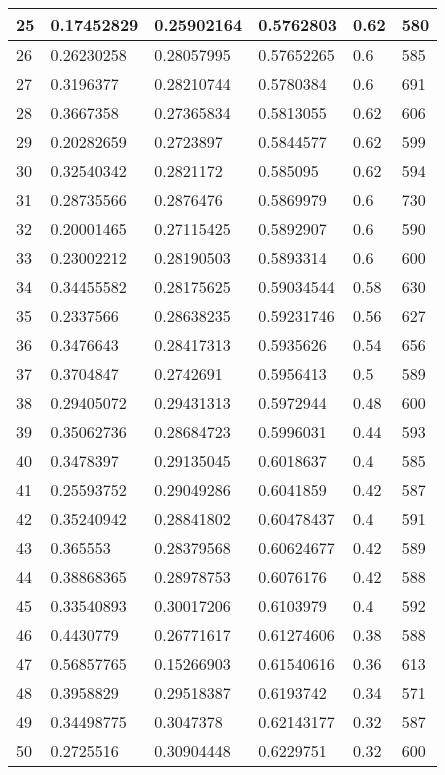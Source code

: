 \begin{longtable}{|l|l|l|l|l|l|}
25 & 0.17452829 & 0.25902164 & 0.5762803 & 0.62 & 580 \\ \hline 
26 & 0.26230258 & 0.28057995 & 0.57652265 & 0.6 & 585 \\ \hline 
27 & 0.3196377 & 0.28210744 & 0.5780384 & 0.6 & 691 \\ \hline 
28 & 0.3667358 & 0.27365834 & 0.5813055 & 0.62 & 606 \\ \hline 
29 & 0.20282659 & 0.2723897 & 0.5844577 & 0.62 & 599 \\ \hline 
30 & 0.32540342 & 0.2821172 & 0.585095 & 0.62 & 594 \\ \hline 
31 & 0.28735566 & 0.2876476 & 0.5869979 & 0.6 & 730 \\ \hline 
32 & 0.20001465 & 0.27115425 & 0.5892907 & 0.6 & 590 \\ \hline 
33 & 0.23002212 & 0.28190503 & 0.5893314 & 0.6 & 600 \\ \hline 
34 & 0.34455582 & 0.28175625 & 0.59034544 & 0.58 & 630 \\ \hline 
35 & 0.2337566 & 0.28638235 & 0.59231746 & 0.56 & 627 \\ \hline 
36 & 0.3476643 & 0.28417313 & 0.5935626 & 0.54 & 656 \\ \hline 
37 & 0.3704847 & 0.2742691 & 0.5956413 & 0.5 & 589 \\ \hline 
38 & 0.29405072 & 0.29431313 & 0.5972944 & 0.48 & 600 \\ \hline 
39 & 0.35062736 & 0.28684723 & 0.5996031 & 0.44 & 593 \\ \hline 
40 & 0.3478397 & 0.29135045 & 0.6018637 & 0.4 & 585 \\ \hline 
41 & 0.25593752 & 0.29049286 & 0.6041859 & 0.42 & 587 \\ \hline 
42 & 0.35240942 & 0.28841802 & 0.60478437 & 0.4 & 591 \\ \hline 
43 & 0.365553 & 0.28379568 & 0.60624677 & 0.42 & 589 \\ \hline 
44 & 0.38868365 & 0.28978753 & 0.6076176 & 0.42 & 588 \\ \hline 
45 & 0.33540893 & 0.30017206 & 0.6103979 & 0.4 & 592 \\ \hline 
46 & 0.4430779 & 0.26771617 & 0.61274606 & 0.38 & 588 \\ \hline 
47 & 0.56857765 & 0.15266903 & 0.61540616 & 0.36 & 613 \\ \hline 
48 & 0.3958829 & 0.29518387 & 0.6193742 & 0.34 & 571 \\ \hline 
49 & 0.34498775 & 0.3047378 & 0.62143177 & 0.32 & 587 \\ \hline 
50 & 0.2725516 & 0.30904448 & 0.6229751 & 0.32 & 600 \\ \hline 
\end{longtable}